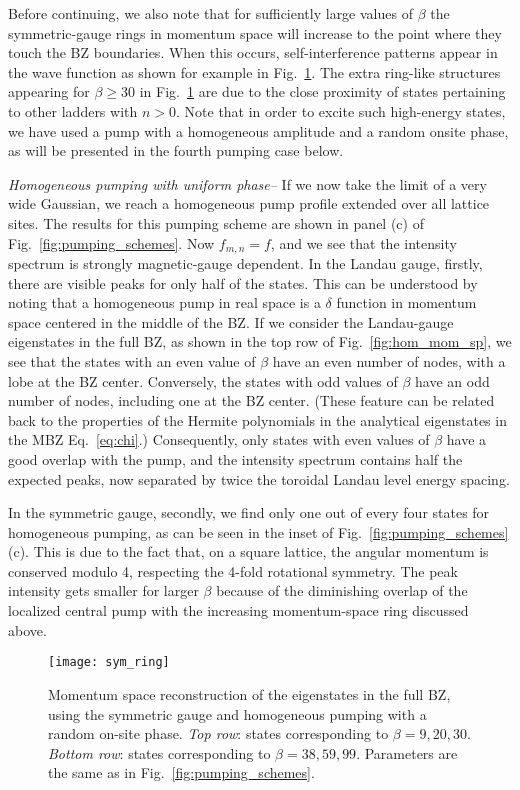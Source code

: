Before continuing, we also note that for sufficiently large values of
$\beta$ the symmetric-gauge rings in momentum space will increase to
the point where they touch the BZ boundaries. When this occurs,
self-interference patterns appear in the wave function as shown for
example in Fig.~\ref{fig:torus_edge}. The extra ring-like structures
appearing for $\beta \geq 30$ in Fig.~\ref{fig:torus_edge} are due to
the close proximity of states pertaining to other ladders with $n
>0$. Note that in order to excite such high-energy states, we have
used a pump with a homogeneous amplitude and a random onsite phase, as
will be presented in the fourth pumping case below.

{\em{Homogeneous pumping with uniform phase--}} If we now take the
limit of a very wide Gaussian, we reach a homogeneous pump profile
extended over all lattice sites. The results for this pumping scheme
are shown in panel (c) of Fig.~\ref{fig:pumping_schemes}. Now $f_{m,n}
= f$, and we see that the intensity spectrum is strongly
magnetic-gauge dependent. In the Landau gauge, firstly, there are
visible peaks for only half of the states. This can be understood by
noting that a homogeneous pump in real space is a $\delta$ function in
momentum space centered in the middle of the BZ. If we consider the
Landau-gauge eigenstates in the full BZ, as shown in the top row of
Fig.~\ref{fig:hom_mom_sp}, we see that the states with an even value
of $\beta$ have an even number of nodes, with a lobe at the BZ
center. Conversely, the states with odd values of $\beta$ have an odd
number of nodes, including one at the BZ center. (These feature can be
related back to the properties of the Hermite polynomials in the
analytical eigenstates in the MBZ Eq.~\eqref{eq:chi}.) Consequently,
only states with even values of $\beta$ have a good overlap with the
pump, and the intensity spectrum contains half the expected peaks, now
separated by twice the toroidal Landau level energy spacing.

In the symmetric gauge, secondly, we find only one out of every four
states for homogeneous pumping, as can be seen in the inset of
Fig.~\ref{fig:pumping_schemes} (c). This is due to the fact that, on a
square lattice, the angular momentum is conserved modulo 4, respecting
the 4-fold rotational symmetry. The peak intensity gets smaller for
larger $\beta$ because of the diminishing overlap of the localized
central pump with the increasing momentum-space ring discussed above.

\begin{figure}[tb] \centering
  \texttt{[image: sym\_ring]}
  \caption{Momentum space reconstruction of the eigenstates in the
full BZ, using the symmetric gauge and homogeneous pumping with a
random on-site phase. \emph{Top row}: states corresponding to $\beta =
9, 20, 30$.  \emph{Bottom row}: states corresponding to $\beta = 38,
59, 99$. Parameters are the same as in
Fig.~\ref{fig:pumping_schemes}.}
  \label{fig:torus_edge}
\end{figure}


